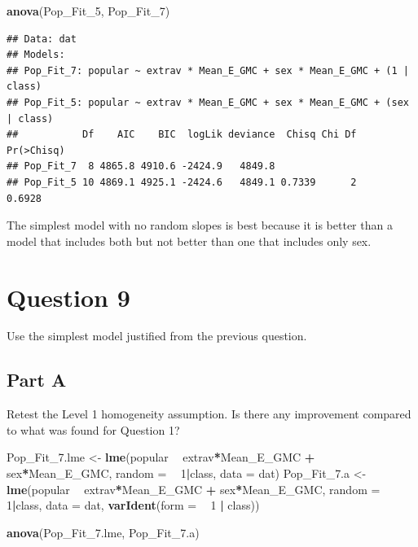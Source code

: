 \documentclass[]{article}
\newenvironment{Shaded}{\begin{snugshade}}{\end{snugshade}}
\newcommand{\KeywordTok}[1]{\textcolor[rgb]{0.13,0.29,0.53}{\textbf{#1}}}
\newcommand{\DataTypeTok}[1]{\textcolor[rgb]{0.13,0.29,0.53}{#1}}
\newcommand{\DecValTok}[1]{\textcolor[rgb]{0.00,0.00,0.81}{#1}}
\newcommand{\FloatTok}[1]{\textcolor[rgb]{0.00,0.00,0.81}{#1}}
\newcommand{\StringTok}[1]{\textcolor[rgb]{0.31,0.60,0.02}{#1}}
\newcommand{\OperatorTok}[1]{\textcolor[rgb]{0.81,0.36,0.00}{\textbf{#1}}}
\newcommand{\NormalTok}[1]{#1}
\begin{document}
\begin{Shaded}
\begin{Highlighting}[]
\KeywordTok{anova}\NormalTok{(Pop_Fit_}\DecValTok{5}\NormalTok{, Pop_Fit_}\DecValTok{7}\NormalTok{)}
\end{Highlighting}
\end{Shaded}

\begin{verbatim}
## Data: dat
## Models:
## Pop_Fit_7: popular ~ extrav * Mean_E_GMC + sex * Mean_E_GMC + (1 | class)
## Pop_Fit_5: popular ~ extrav * Mean_E_GMC + sex * Mean_E_GMC + (sex | class)
##           Df    AIC    BIC  logLik deviance  Chisq Chi Df Pr(>Chisq)
## Pop_Fit_7  8 4865.8 4910.6 -2424.9   4849.8                         
## Pop_Fit_5 10 4869.1 4925.1 -2424.6   4849.1 0.7339      2     0.6928
\end{verbatim}

The simplest model with no random slopes is best because it is better
than a model that includes both but not better than one that includes
only sex.

\section{Question 9}\label{question-9}

Use the simplest model justified from the previous question.

\subsection{Part A}\label{part-a-4}

Retest the Level 1 homogeneity assumption. Is there any improvement
compared to what was found for Question 1?

\begin{Shaded}
\begin{Highlighting}[]
\NormalTok{Pop_Fit_}\FloatTok{7.}\NormalTok{lme <-}\StringTok{ }\KeywordTok{lme}\NormalTok{(popular }\OperatorTok{~}\StringTok{ }\NormalTok{extrav}\OperatorTok{*}\NormalTok{Mean_E_GMC }\OperatorTok{+}\StringTok{ }\NormalTok{sex}\OperatorTok{*}\NormalTok{Mean_E_GMC, }\DataTypeTok{random =} \OperatorTok{~}\StringTok{ }\DecValTok{1}\OperatorTok{|}\NormalTok{class, }\DataTypeTok{data =}\NormalTok{ dat)}
\NormalTok{Pop_Fit_}\FloatTok{7.}\NormalTok{a <-}\StringTok{ }\KeywordTok{lme}\NormalTok{(popular }\OperatorTok{~}\StringTok{ }\NormalTok{extrav}\OperatorTok{*}\NormalTok{Mean_E_GMC }\OperatorTok{+}\StringTok{ }\NormalTok{sex}\OperatorTok{*}\NormalTok{Mean_E_GMC, }\DataTypeTok{random =} \OperatorTok{~}\StringTok{ }\DecValTok{1}\OperatorTok{|}\NormalTok{class, }
                   \DataTypeTok{data =}\NormalTok{ dat, }\KeywordTok{varIdent}\NormalTok{(}\DataTypeTok{form =} \OperatorTok{~}\StringTok{ }\DecValTok{1} \OperatorTok{|}\StringTok{ }\NormalTok{class))}

\KeywordTok{anova}\NormalTok{(Pop_Fit_}\FloatTok{7.}\NormalTok{lme, Pop_Fit_}\FloatTok{7.}\NormalTok{a)}
\end{Highlighting}
\end{Shaded}
\end{document}
